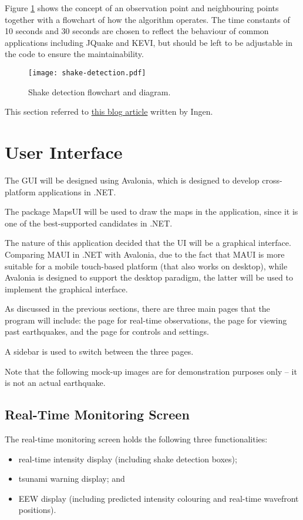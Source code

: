 Figure \ref{fig:shake-detection-diag} shows the concept of an observation point and neighbouring points together with a flowchart of how the algorithm operates. The time constants of 10 seconds and 30 seconds are chosen to reflect the behaviour of common applications including JQuake and KEVI, but should be left to be adjustable in the code to ensure the maintainability.

\begin{figure}[htp]
    \centering
    \texttt{[image: shake-detection.pdf]}
    \caption{Shake detection flowchart and diagram.}
    \label{fig:shake-detection-diag}
\end{figure}

This section referred to \href{https://qiita.com/ingen084/items/82985e8d3227c97c608d}{this blog article} written by Ingen.

\section{User Interface}

The GUI will be designed using Avalonia, which is designed to develop cross-platform applications in .NET.

The package MapsUI \autocite{mapsui-github} will be used to draw the maps in the application, since it is one of the best-supported candidates in .NET.

The nature of this application decided that the UI will be a graphical interface. Comparing MAUI in .NET with Avalonia, due to the fact that MAUI is more suitable for a mobile touch-based platform (that also works on desktop), while Avalonia is designed to support the desktop paradigm, the latter will be used to implement the graphical interface.

As discussed in the previous sections, there are three main pages that the program will include: the page for real-time observations, the page for viewing past earthquakes, and the page for controls and settings.

A sidebar is used to switch between the three pages.

Note that the following mock-up images are for demonstration purposes only -- it is not an actual earthquake.

\subsection{Real-Time Monitoring Screen}

The real-time monitoring screen holds the following three functionalities:
\begin{itemize}
    \item real-time intensity display (including shake detection boxes);
    \item tsunami warning display; and
    \item EEW display (including predicted intensity colouring and real-time wavefront positions).
\end{itemize}


